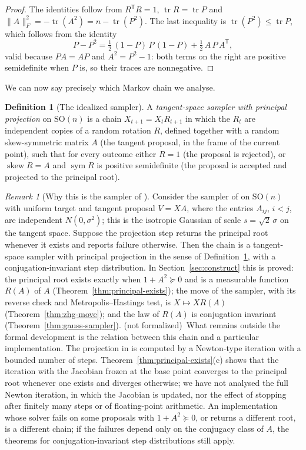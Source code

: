 \documentclass[11pt]{amsart}
\theoremstyle{definition}
\newtheorem{definition}[theorem]{Definition}
\theoremstyle{remark}
\newtheorem{remark}[theorem]{Remark}
\newcommand{\notformal}{\textup{(not formalized)}}
\newcommand{\SO}{\mathrm{SO}}
\newcommand{\tr}{\operatorname{tr}}
\newcommand{\sym}{\operatorname{sym}}
\newcommand{\skw}{\operatorname{skew}}
\newcommand{\fro}[1]{\lVert #1\rVert_{F}}
\newcommand{\transp}{^{\mathsf T}}
\begin{document}
\begin{proof}
The identities follow from $R\transp R=1$, $\tr R=\tr P$ and $\fro{A}^2=-\tr(A^2)=n-\tr(P^2)$.
The last inequality is $\tr(P^2)\le\tr P$, which follows from the identity
\[
  P-P^2=\tfrac12\,(1-P)\,P\,(1-P)+\tfrac12\,A\,P\,A\transp ,
\]
valid because $PA=AP$ and $A^2=P^2-1$: both terms on the right are positive semidefinite when
$P$ is, so their traces are nonnegative.
\end{proof}

We can now say precisely which Markov chain we analyse.

\begin{definition}[The idealized sampler]\label{def:sampler}
A \emph{tangent-space sampler with principal projection} on $\SO(n)$ is a chain
$X_{t+1}=X_tR_{t+1}$ in which the $R_t$ are independent copies of a random rotation $R$, defined
together with a random skew-symmetric matrix $A$ (the tangent proposal, in the frame of the
current point), such that for every outcome either $R=1$ (the proposal is rejected), or
$\skw R=A$ and $\sym R$ is positive semidefinite (the proposal is accepted and projected to the
principal root).
\end{definition}

\begin{remark}[Why this is the sampler of \cite{ZHG}]\label{rem:model}
Consider the sampler of \cite{ZHG} on $\SO(n)$ with uniform target and tangent proposal $V=XA$,
where the entries $A_{ij}$, $i<j$, are independent $N(0,\sigma^2)$; this is the isotropic
Gaussian of scale $s=\sqrt2\,\sigma$ on the tangent space.  Suppose the projection step returns
the principal root whenever it exists and reports failure otherwise.  Then the chain is a
tangent-space sampler with principal projection in the sense of Definition~\ref{def:sampler},
with a conjugation-invariant step distribution.  In Section~\ref{sec:construct} this is proved:
the principal root exists exactly when $1+A^2\succeq0$ and is a measurable function $R(A)$ of
$A$ (Theorem~\ref{thm:principal-exists}); the move of the sampler, with its reverse check and
Metropolis--Hastings test, is $X\mapsto XR(A)$ (Theorem~\ref{thm:zhg-move}); and the law of
$R(A)$ is conjugation invariant (Theorem~\ref{thm:gauss-sampler}).
\notformal\ What remains outside the formal development is the relation between this chain and
a particular implementation.  The projection in \cite{ZHG} is computed by a Newton-type
iteration with a bounded number of steps.  Theorem~\ref{thm:principal-exists}(c) shows that the
iteration with the Jacobian frozen at the base point converges to the principal root whenever
one exists and diverges otherwise; we have not analysed the full Newton iteration, in which the
Jacobian is updated, nor the effect of stopping after finitely many steps or of floating-point
arithmetic.  An implementation whose solver fails on some proposals with $1+A^2\succeq0$, or
returns a different root, is a different chain; if the failures depend only on the conjugacy
class of $A$, the theorems for conjugation-invariant step distributions still apply.
\end{remark}
\end{document}
